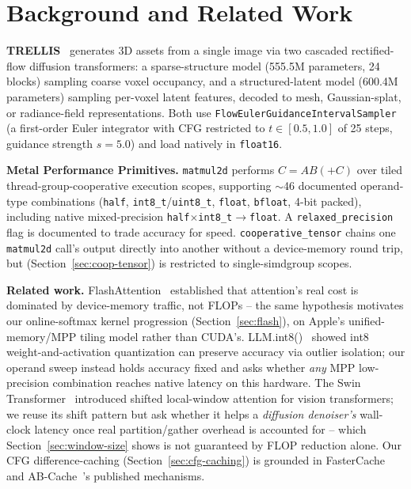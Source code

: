 \documentclass{article}
\newcommand{\code}[1]{\texttt{#1}}
\begin{document}
\section{Background and Related Work}
\label{sec:background}

\textbf{TRELLIS}~\cite{trellis2024} generates 3D assets from a single image via two cascaded
rectified-flow diffusion transformers: a sparse-structure model (555.5M parameters, 24 blocks)
sampling coarse voxel occupancy, and a structured-latent model (600.4M parameters) sampling
per-voxel latent features, decoded to mesh, Gaussian-splat, or radiance-field representations. Both
use \code{FlowEulerGuidanceIntervalSampler} (a first-order Euler integrator with CFG restricted to
$t \in [0.5,1.0]$ of 25 steps, guidance strength $s{=}5.0$) and load natively in \code{float16}.

\textbf{Metal Performance Primitives.} \code{matmul2d} performs $C=AB(+C)$ over tiled
thread-group-cooperative execution scopes, supporting $\sim$46 documented operand-type
combinations (\code{half}, \code{int8\_t}/\code{uint8\_t}, \code{float}, \code{bfloat}, 4-bit
packed), including native mixed-precision \code{half}$\times$\code{int8\_t}$\to$\code{float}. A
\code{relaxed\_precision} flag is documented to trade accuracy for speed.
\code{cooperative\_tensor} chains one \code{matmul2d} call's output directly into another without
a device-memory round trip, but (Section~\ref{sec:coop-tensor}) is restricted to single-simdgroup
scopes.

\textbf{Related work.} FlashAttention~\cite{flashattention} established that attention's real cost
is dominated by device-memory traffic, not FLOPs -- the same hypothesis motivates our
online-softmax kernel progression (Section~\ref{sec:flash}), on Apple's unified-memory/MPP tiling
model rather than CUDA's. LLM.int8()~\cite{llmint8} showed int8 weight-and-activation quantization
can preserve accuracy via outlier isolation; our operand sweep instead holds accuracy fixed and
asks whether \emph{any} MPP low-precision combination reaches native latency on this hardware. The
Swin Transformer~\cite{swin} introduced shifted local-window attention for vision transformers; we
reuse its shift pattern but ask whether it helps a \emph{diffusion denoiser's} wall-clock latency
once real partition/gather overhead is accounted for -- which Section~\ref{sec:window-size} shows
is not guaranteed by FLOP reduction alone. Our CFG difference-caching
(Section~\ref{sec:cfg-caching}) is grounded in FasterCache~\cite{fastercache} and
AB-Cache~\cite{abcache}'s published mechanisms.
\end{document}
